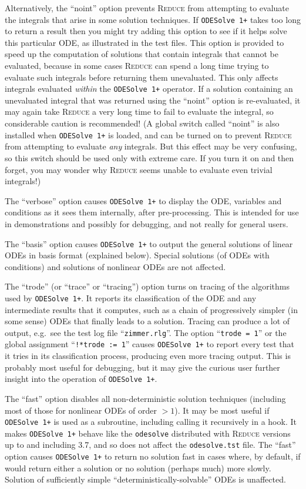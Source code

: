 \documentclass[a4paper]{article} %
\newcommand{\ODESolve}[1]{\texttt{ODESolve\,#1}}
\newcommand{\odesolve}{\texttt{odesolve}}
\newcommand{\REDUCE}{\textsc{Reduce}}
\begin{document}
Alternatively, the ``noint'' option prevents \REDUCE{} from attempting
to evaluate the integrals that arise in some solution techniques.  If
\ODESolve{1+} takes too long to return a result then you might try
adding this option to see if it helps solve this particular ODE, as
illustrated in the test files.  This option is provided to speed up
the computation of solutions that contain integrals that cannot be
evaluated, because in some cases \REDUCE{} can spend a long time
trying to evaluate such integrals before returning them unevaluated.
This only affects integrals evaluated \emph{within} the \ODESolve{1+}
operator.  If a solution containing an unevaluated integral that was
returned using the ``noint'' option is re-evaluated, it may again take
\REDUCE{} a very long time to fail to evaluate the integral, so
considerable caution is recommended!  (A global switch called
``noint'' is also installed when \ODESolve{1+} is loaded, and can be
turned on to prevent \REDUCE{} from attempting to evaluate \emph{any}
integrals.  But this effect may be very confusing, so this switch
should be used only with extreme care.  If you turn it on and then
forget, you may wonder why \REDUCE{} seems unable to evaluate even
trivial integrals!)

The ``verbose'' option causes \ODESolve{1+} to display the ODE,
variables and conditions as it sees them internally, after
pre-processing.  This is intended for use in demonstrations and
possibly for debugging, and not really for general users.

The ``basis'' option causes \ODESolve{1+} to output the general
solutions of linear ODEs in basis format (explained below).  Special
solutions (of ODEs with conditions) and solutions of nonlinear ODEs
are not affected.

The ``trode'' (or ``trace'' or ``tracing'') option turns on tracing of
the algorithms used by \ODESolve{1+}.  It reports its classification
of the ODE and any intermediate results that it computes, such as a
chain of progressively simpler (in some sense) ODEs that finally leads
to a solution.  Tracing can produce a lot of output, e.g.\ see the
test log file ``\texttt{zimmer.rlg}''.  The option ``\texttt{trode =
1}'' or the global assignment ``\texttt{!*trode := 1}'' causes
\ODESolve{1+} to report every test that it tries in its classification
process, producing even more tracing output.  This is probably most
useful for debugging, but it may give the curious user further insight
into the operation of \ODESolve{1+}.

The ``fast'' option disables all non-deterministic solution techniques
(including most of those for nonlinear ODEs of order $> 1$).  It may
be most useful if \ODESolve{1+} is used as a subroutine, including
calling it recursively in a hook.  It makes \ODESolve{1+} behave like
the \odesolve{} distributed with \REDUCE{} versions up to and
including 3.7, and so does not affect the \texttt{odesolve.tst} file.
The ``fast'' option causes \ODESolve{1+} to return no solution fast in
cases where, by default, if would return either a solution or no
solution (perhaps much) more slowly.  Solution of sufficiently simple
``deterministically-solvable'' ODEs is unaffected.
\end{document}
